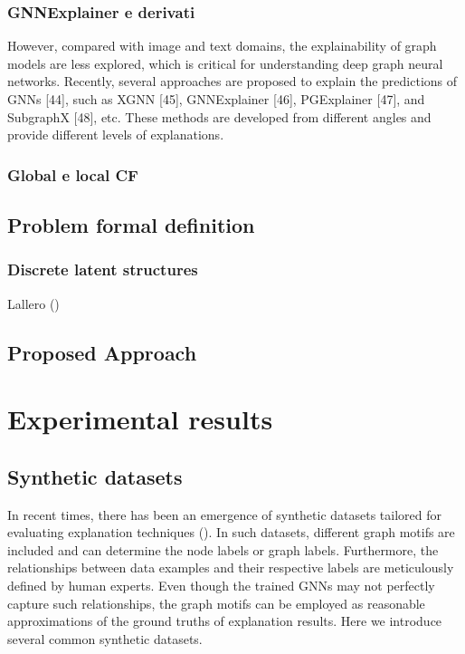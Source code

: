 \documentclass[binding=0.6cm]{sapthesis}
\newcommand{\mycite}[1]{(\cite{#1})}
\begin{document}
\subsection{GNNExplainer e derivati}
\label{sec:cfpg.bg.gnnexplainer}
However, compared with image and text domains, the explainability of graph models are less explored, which is critical for understanding deep graph neural networks. Recently, several approaches are proposed to explain the predictions of GNNs [44], such as XGNN [45], GNNExplainer [46], PGExplainer [47], and SubgraphX [48], etc. These methods are developed from different angles and provide different levels of explanations.

\subsection{Global e local CF}
\label{sec:cfpg.bg.global-local-expl}


\section{Problem formal definition}
\label{sec:cfpg.bg.form-def}

\subsection{Discrete latent structures}
\label{sec:cfpg.bg.discrete-latent}
Lallero \mycite{niculae2023-discrete-latent}

\section{Proposed Approach}
\label{sec:cfpg.bg.my-archs}





\chapter{Experimental results}
\label{chap:4-expRes}

\section{Synthetic datasets}
\label{sec:expRes.syns-dataset}
In recent times, there has been an emergence of synthetic datasets tailored for evaluating explanation techniques (\cite{ying2019-gnnexplainer,luo2020-pgexplainer}). In such datasets, different graph motifs are included and can determine the node labels or graph labels. Furthermore, the relationships between data examples and their respective labels are meticulously defined by human experts. Even though the trained GNNs may not perfectly capture such relationships, the graph motifs can be employed as reasonable approximations of the ground truths of explanation results. Here we introduce several common synthetic datasets.
\end{document}
